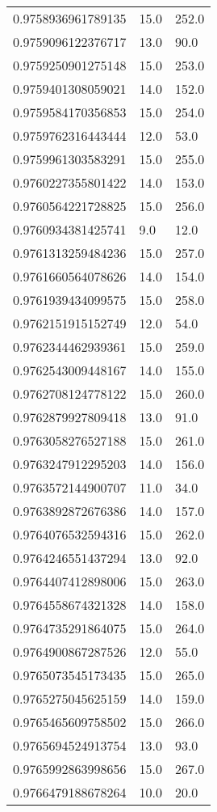 \begin{center}
\begin{supertabular}[H]{p{0.30\textwidth}p{0.05\textwidth}p{0.05\textwidth}}
0.9758936961789135 & 15.0 & 252.0 \\ 
0.9759096122376717 & 13.0 & 90.0 \\ 
0.9759250901275148 & 15.0 & 253.0 \\ 
0.9759401308059021 & 14.0 & 152.0 \\ 
0.9759584170356853 & 15.0 & 254.0 \\ 
0.9759762316443444 & 12.0 & 53.0 \\ 
0.9759961303583291 & 15.0 & 255.0 \\ 
0.9760227355801422 & 14.0 & 153.0 \\ 
0.9760564221728825 & 15.0 & 256.0 \\ 
0.9760934381425741 & 9.0 & 12.0 \\ 
0.9761313259484236 & 15.0 & 257.0 \\ 
0.9761660564078626 & 14.0 & 154.0 \\ 
0.9761939434099575 & 15.0 & 258.0 \\ 
0.9762151915152749 & 12.0 & 54.0 \\ 
0.9762344462939361 & 15.0 & 259.0 \\ 
0.9762543009448167 & 14.0 & 155.0 \\ 
0.9762708124778122 & 15.0 & 260.0 \\ 
0.9762879927809418 & 13.0 & 91.0 \\ 
0.9763058276527188 & 15.0 & 261.0 \\ 
0.9763247912295203 & 14.0 & 156.0 \\ 
0.9763572144900707 & 11.0 & 34.0 \\ 
0.9763892872676386 & 14.0 & 157.0 \\ 
0.9764076532594316 & 15.0 & 262.0 \\ 
0.9764246551437294 & 13.0 & 92.0 \\ 
0.9764407412898006 & 15.0 & 263.0 \\ 
0.9764558674321328 & 14.0 & 158.0 \\ 
0.9764735291864075 & 15.0 & 264.0 \\ 
0.9764900867287526 & 12.0 & 55.0 \\ 
0.9765073545173435 & 15.0 & 265.0 \\ 
0.9765275045625159 & 14.0 & 159.0 \\ 
0.9765465609758502 & 15.0 & 266.0 \\ 
0.9765694524913754 & 13.0 & 93.0 \\ 
0.9765992863998656 & 15.0 & 267.0 \\ 
0.9766479188678264 & 10.0 & 20.0 \\ 

\end{supertabular}
\end{center}

